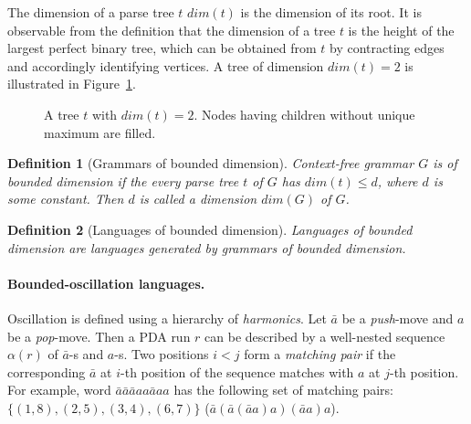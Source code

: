 \documentclass[11pt,a4paper]{article} %
\newtheorem{definition}{Definition}
\begin{document}
The dimension of a parse tree $t$ $dim(t)$ is the dimension of its root. 
It is observable from the definition that the dimension of a tree $t$
is the height of the largest perfect binary tree,
which can be obtained from $t$ by contracting edges and accordingly identifying vertices.
A tree of dimension $dim(t) = 2$ is illustrated in Figure~\ref{oscbtree}.
\begin{figure}
\centering
{}
\caption{A tree $t$ with $dim(t)=2$. Nodes having children without unique maximum are filled.}
\label{oscbtree}            
\end{figure}

\begin{definition}[Grammars of bounded dimension]
Context-free grammar $G$ is of bounded dimension if the every parse tree $t$ of $G$ has $dim(t) \le d$, where $d$ is some constant. Then $d$ is called a dimension $dim(G)$ of $G$.
\end{definition}

\begin{definition}[Languages of bounded dimension]
Languages of bounded dimension are languages generated by grammars of bounded dimension. 
\end{definition}







\paragraph{Bounded-oscillation languages.} 
Oscillation is defined using a hierarchy of \textit{harmonics}. Let $\bar{a}$ be a \textit{push}-move and $a$ be a \textit{pop}-move. Then a PDA run $r$ can be described by a well-nested sequence $\alpha(r)$ of $\bar{a}$-s and $a$-s. Two positions $i<j$ form a \textit{matching pair} if the corresponding $\bar{a}$ at $i$-th position of the sequence matches with $a$ at $j$-th position. For example, word $\bar{a}\bar{a}\bar{a}aa\bar{a}aa$ has the following set of matching pairs: $\{(1, 8), (2, 5), (3, 4), (6, 7)\}$ ($\bar{a}(\bar{a}(\bar{a}a)a)(\bar{a}a)a$).
\end{document}

